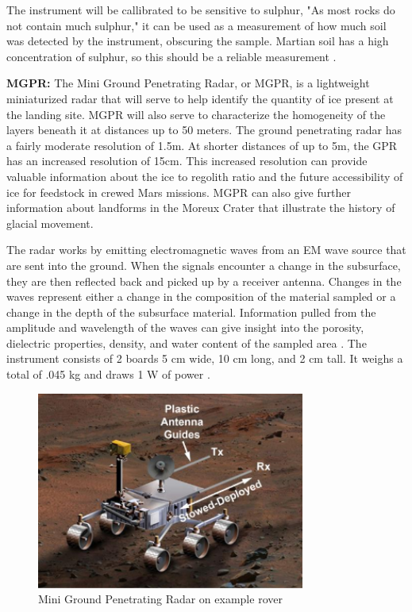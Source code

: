 \documentclass[%
 portrait,
 aapm,
 mph,%
 amsmath,amssymb,
 reprint,%
]{revtex4-2}
\begin{document}
The instrument will be callibrated to be sensitive to sulphur, "As most rocks do not contain much sulphur," it can be used as a measurement of how much soil was detected by the instrument, obscuring the sample. Martian soil has a high concentration of sulphur, so this should be a reliable measurement \cite{bruckner2003refined}.

\textbf{MGPR: }The Mini Ground Penetrating Radar, or MGPR, is a lightweight miniaturized radar that will serve to help identify the quantity of ice present at the landing site. MGPR will also serve to characterize the homogeneity of the layers beneath it at distances up to 50 meters. The ground penetrating radar has a fairly moderate resolution of 1.5m.  At shorter distances of up to 5m, the GPR has an increased resolution of 15cm. This increased resolution can provide valuable information about the ice to regolith ratio and the future accessibility of ice for feedstock in crewed Mars missions. MGPR can also give further information about landforms in the Moreux Crater that illustrate the history of glacial movement. 

The radar works by emitting electromagnetic waves from an EM wave source that are sent into the ground. When the signals encounter a change in the subsurface, they are then reflected back and picked up by a receiver antenna. Changes in the waves represent either a change in the composition of the material sampled or a change in the depth of the subsurface material. Information pulled from the amplitude and wavelength of the waves can give insight into the porosity, dielectric properties, density, and water content of the sampled area \cite{kim2012miniature, conyers2006innovative}. 
The instrument consists of 2 boards 5 cm wide, 10 cm long, and 2 cm tall. It weighs a total of .045 kg and draws 1 W of power \cite{kim2012miniature}. 
\begin{figure}[h!]
  \includegraphics[width=250pt]{Instruments/xMGPR.png}
   \caption{Mini Ground Penetrating Radar on example rover \cite{kim2012miniature}}
\end{figure} 
\end{document}
